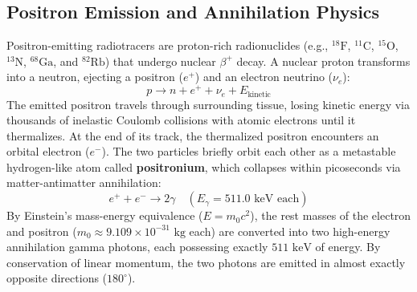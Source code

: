 \documentclass[11pt,a4paper]{article}
\begin{document}
\subsection{Positron Emission and Annihilation Physics}
Positron-emitting radiotracers are proton-rich radionuclides (e.g., $^{18}\text{F}$, $^{11}\text{C}$, $^{15}\text{O}$, $^{13}\text{N}$, $^{68}\text{Ga}$, and $^{82}\text{Rb}$) that undergo nuclear $\beta^+$ decay. A nuclear proton transforms into a neutron, ejecting a positron ($e^+$) and an electron neutrino ($\nu_e$):
\begin{equation}
    p \longrightarrow n + e^+ + \nu_e + E_{\text{kinetic}}
\end{equation}
The emitted positron travels through surrounding tissue, losing kinetic energy via thousands of inelastic Coulomb collisions with atomic electrons until it thermalizes. At the end of its track, the thermalized positron encounters an orbital electron ($e^-$). The two particles briefly orbit each other as a metastable hydrogen-like atom called \textbf{positronium}, which collapses within picoseconds via matter-antimatter annihilation:
\begin{equation}
    e^+ + e^- \longrightarrow 2\gamma \quad (E_\gamma = 511.0\text{ keV each})
\end{equation}
By Einstein's mass-energy equivalence ($E = m_0 c^2$), the rest masses of the electron and positron ($m_0 \approx 9.109 \times 10^{-31}\text{ kg}$ each) are converted into two high-energy annihilation gamma photons, each possessing exactly $511\text{ keV}$ of energy. By conservation of linear momentum, the two photons are emitted in almost exactly opposite directions ($180^\circ$).
\end{document}
